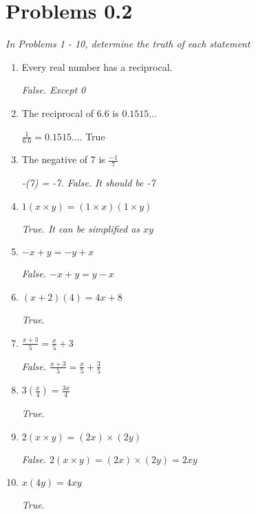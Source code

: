 \documentclass{article}
\begin{document}
\break

\section{Problems 0.2}\par
\textit{In Problems 1 - 10, determine the truth of each statement}

\begin{enumerate}
    \item Every real number has a reciprocal. \par
    \textit{False. Except 0}

    \item The reciprocal of $6.6$ is $0.1515\dots$ \par
    \textit{$\frac{1}{6.6} = 0.1515\dots$}. True

    \item The negative of 7 is $\frac{-1}{7}$ \par
    \textit{-(7) = -7. False. It should be -7}

    \item $1(x \times y) = (1 \times x)(1 \times y)$ \par
    \textit{True. It can be simplified as $xy$}

    \item $-x + y = -y + x$\par
    \textit{False. $-x + y = y - x$}

    \item $(x + 2)(4) = 4x + 8$\par
    \textit{True.}

    \item $\frac{x + 3}{5} = \frac{x}{5} + 3$\par
    \textit{False. $\frac{x + 3}{5} = \frac{x}{5} + \frac{3}{5}$}

    \item $3 \left( \frac{x}{4} \right) = \frac{3x}{4}$\par
    \textit{True.}

    \item $2(x \times y) = (2x) \times (2y)$\par
    \textit{False. $2(x \times y) = (2x) \times (2y) = 2xy$}

    \item $x(4y) = 4xy$\par
    \textit{True.}\par
\end{enumerate}
\end{document}
